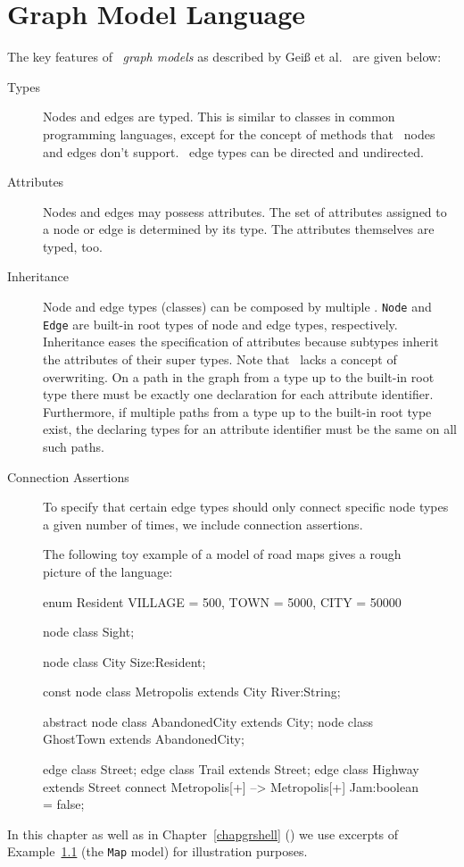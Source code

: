 \chapter{Graph Model Language}
\label{chapmodellang}
The key features of \GrG\ \emph{graph models} as described by Geiß et al.~\cite{GBGHS:06,KG:07} are given below:

\begin{description}
\item[Types] Nodes and edges are typed. 
  This is similar to classes in common programming languages, except for the concept of methods that \GrG\ nodes and edges don't support. \GrG\ edge types can be directed and undirected.
\item[Attributes] Nodes and edges may possess attributes. The set of attributes assigned to a node or edge is determined by its type. The attributes themselves are typed, too.
\item[Inheritance] Node and edge types (classes) can be composed by multiple . \texttt{Node} and \texttt{Edge} are built-in root types of node and edge types, respectively. Inheritance eases the specification of attributes because subtypes inherit the attributes of their super types. Note that \GrG\ lacks a concept of overwriting. On a path in the  graph from a type up to the built-in root type there must be exactly one declaration for each attribute identifier. Furthermore, if multiple paths from a type up to the built-in root type exist, the declaring types for an attribute identifier must be the same on all such paths.
\item[Connection Assertions] To specify that certain edge types should only connect specific node types a given number of times, we include connection assertions.
\end{description}

\begin{figure}[htbf]
\begin{example}\label{ex:model:map}
The following toy example of a model of road maps gives a rough picture of the language:
\begin{grgen}
enum Resident {VILLAGE = 500, TOWN = 5000, CITY = 50000}

node class Sight;

node class City {
	Size:Resident;
}

const node class Metropolis extends City {
  River:String;
}  

abstract node class AbandonedCity extends City;
node class GhostTown extends AbandonedCity;

edge class Street;
edge class Trail extends Street;
edge class Highway extends Street
    connect Metropolis[+] --> Metropolis[+]
{
    Jam:boolean = false;
}
\end{grgen}
\end{example}
\end{figure}
In this chapter as well as in Chapter~\ref{chapgrshell} (\GrShell) we use excerpts of Example~\ref{ex:model:map} (the \texttt{Map} model) for illustration purposes.

